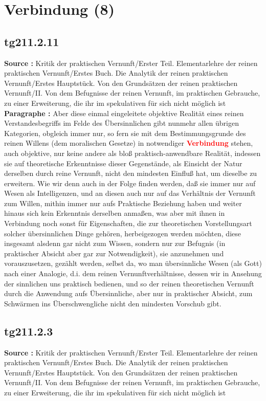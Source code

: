 \documentclass[a4paper,12pt,twoside]{book}
\newcommand{\match}[1]{\textcolor{red}{\textbf{#1}}}
\newcommand{\unnumberedsection}[1]{
	\section*{#1}
	\addcontentsline{toc}{section}{#1}
	\markright{#1}
}
\begin{document}
	\unnumberedsection{Verbindung (8)} 
	\subsection*{tg211.2.11} 
	\textbf{Source : }Kritik der praktischen Vernunft/Erster Teil. Elementarlehre der reinen praktischen Vernunft/Erstes Buch. Die Analytik der reinen praktischen Vernunft/Erstes Hauptstück. Von den Grundsätzen der reinen praktischen Vernunft/II. Von dem Befugnisse der reinen Vernunft, im praktischen Gebrauche, zu einer Erweiterung, die ihr im spekulativen für sich nicht möglich ist\\  
	
	\textbf{Paragraphe : }Aber diese einmal eingeleitete objektive Realität eines reinen Verstandesbegriffs im Felde des Übersinnlichen gibt nunmehr allen übrigen Kategorien, obgleich immer nur, so fern sie mit dem Bestimmungsgrunde des reinen Willens (dem moralischen Gesetze) in notwendiger \match{Verbindung} stehen, auch objektive, nur keine andere als bloß praktisch-anwendbare Realität, indessen sie auf theoretische Erkenntnisse dieser Gegenstände, als Einsicht der Natur derselben durch reine Vernunft, nicht den mindesten Einfluß hat, um dieselbe zu erweitern. Wie wir denn auch in der Folge finden werden, daß sie immer nur auf Wesen als Intelligenzen, und an diesen auch nur auf das Verhältnis der Vernunft zum Willen, mithin immer nur aufs Praktische Beziehung haben und weiter hinaus sich kein Erkenntnis derselben anmaßen, was aber mit ihnen in Verbindung noch sonst für Eigenschaften, die zur theoretischen Vorstellungsart solcher übersinnlichen Dinge gehören, herbeigezogen werden möchten, diese insgesamt alsdenn gar nicht zum Wissen, sondern nur zur Befugnis (in praktischer Absicht aber gar zur Notwendigkeit), sie anzunehmen und vorauszusetzen, gezählt werden, selbst da, wo man übersinnliche Wesen (als Gott) nach einer Analogie, d.i. dem reinen Vernunftverhältnisse, dessen wir in Ansehung der sinnlichen uns praktisch bedienen, und so der reinen theoretischen Vernunft durch die Anwendung aufs Übersinnliche, aber nur in praktischer Absicht, zum Schwärmen ins Überschwengliche nicht den mindesten Vorschub gibt. 
	
	\subsection*{tg211.2.3} 
	\textbf{Source : }Kritik der praktischen Vernunft/Erster Teil. Elementarlehre der reinen praktischen Vernunft/Erstes Buch. Die Analytik der reinen praktischen Vernunft/Erstes Hauptstück. Von den Grundsätzen der reinen praktischen Vernunft/II. Von dem Befugnisse der reinen Vernunft, im praktischen Gebrauche, zu einer Erweiterung, die ihr im spekulativen für sich nicht möglich ist\\  
	
\end{document}

